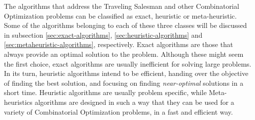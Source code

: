 The algorithms that address the Traveling Salesman and other Combinatorial Optimization problems can be classified as exact, heuristic or meta-heuristic. Some of the algorithms belonging to each of these three classes will be discussed in subsection \ref{sec:exact-algorithms}, \ref{sec:heuristic-algorithms} and \ref{sec:metaheuristic-algorithms}, respectively. Exact algorithms are those that always provide an optimal solution to the problem. Although these might seem the first choice, exact algorithms are usually inefficient for solving large problems. In its turn, heuristic algorithms intend to be efficient, handing over the objective of finding the best solution, and focusing on finding \textit{near-optimal} solutions in a short time. Heuristic algorithms are usually problem specific, while Meta-heuristics algorithms are designed in such a way that they can be used for a variety of Combinatorial Optimization problems, in a fast and efficient way.



